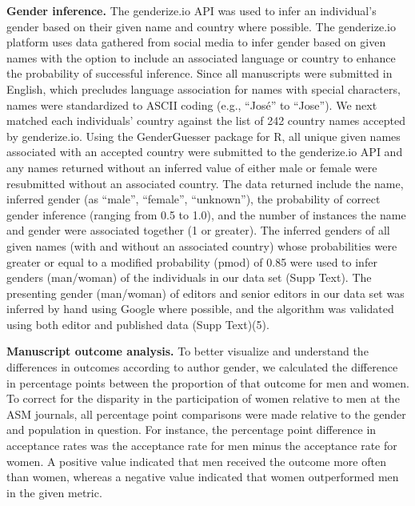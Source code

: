 \documentclass[11pt,]{article}
\begin{document}
\textbf{Gender inference.} The genderize.io API was used to infer an
individual's gender based on their given name and country where
possible. The genderize.io platform uses data gathered from social media
to infer gender based on given names with the option to include an
associated language or country to enhance the probability of successful
inference. Since all manuscripts were submitted in English, which
precludes language association for names with special characters, names
were standardized to ASCII coding (e.g., ``José'' to ``Jose''). We next
matched each individuals' country against the list of 242 country names
accepted by genderize.io. Using the GenderGuesser package for R, all
unique given names associated with an accepted country were submitted to
the genderize.io API and any names returned without an inferred value of
either male or female were resubmitted without an associated country.
The data returned include the name, inferred gender (as ``male'',
``female'', ``unknown''), the probability of correct gender inference
(ranging from 0.5 to 1.0), and the number of instances the name and
gender were associated together (1 or greater). The inferred genders of
all given names (with and without an associated country) whose
probabilities were greater or equal to a modified probability (pmod) of
0.85 were used to infer genders (man/woman) of the individuals in our
data set (Supp Text). The presenting gender (man/woman) of editors and
senior editors in our data set was inferred by hand using Google where
possible, and the algorithm was validated using both editor and
published data (Supp Text)(5).

\textbf{Manuscript outcome analysis.} To better visualize and understand
the differences in outcomes according to author gender, we calculated
the difference in percentage points between the proportion of that
outcome for men and women. To correct for the disparity in the
participation of women relative to men at the ASM journals, all
percentage point comparisons were made relative to the gender and
population in question. For instance, the percentage point difference in
acceptance rates was the acceptance rate for men minus the acceptance
rate for women. A positive value indicated that men received the outcome
more often than women, whereas a negative value indicated that women
outperformed men in the given metric.
\end{document}

